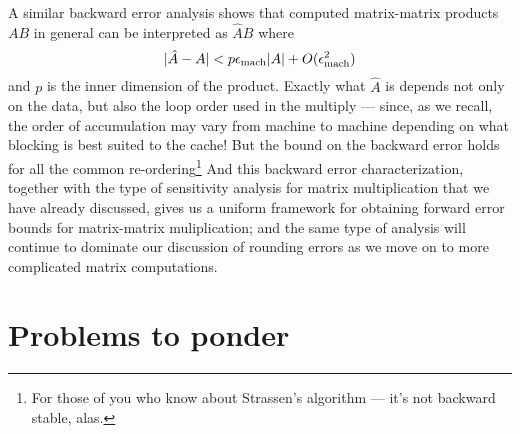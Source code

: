 \documentclass[12pt, leqno]{article} %
\begin{document}
A similar backward error analysis shows that computed matrix-matrix
products $AB$ in general can be interpreted as $\hat{A} B$ where
\[
  |\hat{A}-A| < p \epsilon_{\mathrm{mach}} |A| + O(\epsilon_{\mathrm{mach}}^2)
\]
and $p$ is the inner dimension of the product.  Exactly what $\hat{A}$
is depends not only on the data, but also the loop order used in the
multiply --- since, as we recall, the order of accumulation may vary
from machine to machine depending on what blocking is best suited to
the cache!  But the bound on the backward error holds for all the common
re-ordering\footnote{%
For those of you who know about Strassen's algorithm --- it's not
backward stable, alas.
}
And this backward error characterization, together with the
type of sensitivity analysis for matrix multiplication that we have
already discussed, gives us a uniform framework for obtaining
forward error bounds for matrix-matrix muliplication; and the same
type of analysis will continue to dominate our discussion of rounding
errors as we move on to more complicated matrix computations.

\section{Problems to ponder}
\end{document}
